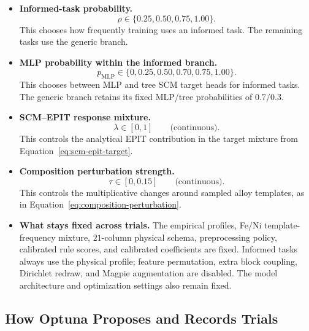 \documentclass[11pt]{article}
\newenvironment{notes}
  {\begin{itemize}\setlength{\itemsep}{0.45em}\setlength{\parsep}{0pt}}
  {\end{itemize}}
\begin{document}
\begin{notes}
    \item \textbf{Informed-task probability.}
    \[
        \rho\in\{0.25,0.50,0.75,1.00\}.
    \]
    This chooses how frequently training uses an informed
    task. The remaining tasks use the generic branch.

    \item \textbf{MLP probability within the informed branch.}
    \[
        p_{\mathrm{MLP}}\in\{0,0.25,0.50,0.70,0.75,1.00\}.
    \]
    This chooses between MLP and tree SCM target heads for
    informed tasks. The generic branch retains its fixed
    MLP/tree probabilities of \(0.7/0.3\).

    \item \textbf{SCM--EPIT response mixture.}
    \[
        \lambda\in[0,1]\qquad\text{(continuous)}.
    \]
    This controls the analytical EPIT contribution in the
    target mixture from Equation~\eqref{eq:scm-epit-target}.

    \item \textbf{Composition perturbation strength.}
    \[
        \tau\in[0,0.15]\qquad\text{(continuous)}.
    \]
    This controls the multiplicative changes around sampled
    alloy templates, as in
    Equation~\eqref{eq:composition-perturbation}.

    \item \textbf{What stays fixed across trials.}
    The empirical profiles, Fe/Ni template-frequency mixture,
    \(21\)-column physical schema, preprocessing policy,
    calibrated rule scores, and calibrated coefficients are
    fixed. Informed tasks always use the physical profile;
    feature permutation, extra block coupling, Dirichlet
    redraw, and Magpie augmentation are disabled.
    The model architecture and optimization settings also
    remain fixed.
\end{notes}

\subsection{How Optuna Proposes and Records Trials}
\label{sec:optuna-trial-proposals}
\end{document}
